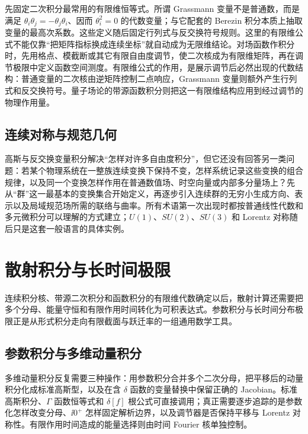 先固定二次积分最常用的有限维恒等式。所谓 Grassmann 变量不是普通数，而是满足 $\theta_i\theta_j=-\theta_j\theta_i$、因而 $\theta_i^2=0$ 的代数变量；与它配套的 Berezin 积分本质上抽取变量的最高次系数。这些定义随后固定行列式与反交换符号规则。这里的有限维公式不能仅靠“把矩阵指标换成连续坐标”就自动成为无限维结论。对场函数作积分时，先用格点、模截断或其它有限自由度调节，使二次核成为有限维矩阵，再在调节极限中定义函数空间测度。有限维公式的作用，是展示调节后必然出现的代数结构：普通变量的二次核由逆矩阵控制二点响应，Grassmann 变量则额外产生行列式和反交换符号。量子场论的带源函数积分则把这一有限维结构应用到经过调节的物理作用量。





\subsection{连续对称与规范几何}
高斯与反交换变量积分解决“怎样对许多自由度积分”，但它还没有回答另一类问题：若某个物理系统在一整族连续变换下保持不变，怎样系统记录这些变换的组合规律，以及同一个变换怎样作用在普通数值场、时空向量或内部多分量场上？先从“群”这一最基本的变换集合开始定义，再逐步引入连续群的无穷小生成方向、表示以及局域规范场所需的联络与曲率。所有术语第一次出现时都按普通线性代数和多元微积分可以理解的方式建立；$U(1)$、$SU(2)$、$SU(3)$ 和 Lorentz 对称随后只是这套一般语言的具体实例。







\section{散射积分与长时间极限}

连续积分核、带源二次积分和函数积分的有限维代数确定以后，散射计算还需要把多个分母、能量守恒和有限作用时间转化为可积表达式。参数积分与长时间分布极限正是从形式积分走向有限截面与跃迁率的一组通用数学工具。

\subsection{参数积分与多维动量积分}
多维动量积分反复需要三种操作：用参数积分合并多个二次分母，把平移后的动量积分化成标准高斯型，以及在含 $\delta$ 函数的变量替换中保留正确的 Jacobian。标准高斯积分、$\Gamma$ 函数恒等式和 $\delta[f]$ 根公式可直接调用；真正需要逐步追踪的是参数化怎样改变分母、$\ii0^+$ 怎样固定解析边界，以及调节器是否保持平移与 Lorentz 对称性。有限作用时间造成的能量选择则由时间 Fourier 核单独控制。

